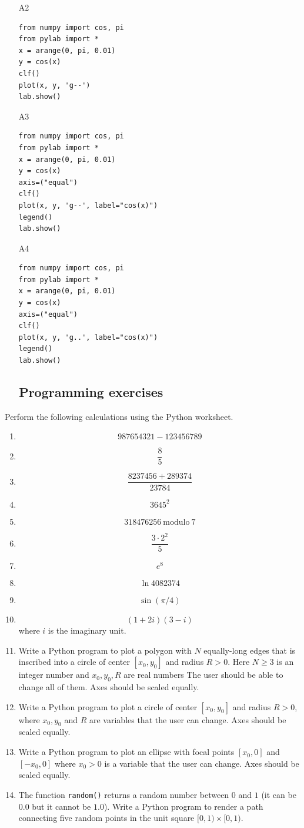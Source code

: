\begin{enumerate}
\begin{enumerate}
\item[A2] 
\begin{verbatim}
from numpy import cos, pi
from pylab import *
x = arange(0, pi, 0.01)
y = cos(x)
clf()
plot(x, y, 'g--')
lab.show()
\end{verbatim}
\item[A3] 
\begin{verbatim}
from numpy import cos, pi
from pylab import *
x = arange(0, pi, 0.01)
y = cos(x)
axis=("equal")
clf()
plot(x, y, 'g--', label="cos(x)")
legend()
lab.show()
\end{verbatim}
\item[A4] 
\begin{verbatim}
from numpy import cos, pi
from pylab import *
x = arange(0, pi, 0.01)
y = cos(x)
axis=("equal")
clf()
plot(x, y, 'g..', label="cos(x)")
legend()
lab.show()
\end{verbatim}
\end{enumerate}
\end{enumerate}

\subsection{\ \ Programming exercises}
Perform the following calculations using the Python worksheet.
\begin{enumerate}
\item 
$$
  987654321 - 123456789
$$
\item 
$$
\frac{8}{5}
$$
\item 
$$
  \frac{8237456 + 289374}{23784}
$$ 
\item 
$$
  3645^2
$$
\item 
$$
  318476256 \ \mbox{modulo} \ 7
$$
\item 
$$
  \frac{3\cdot 2^2}{5} 
$$
\item 
$$
  e^8
$$
\item 
$$
  \ln 4082374
$$
\item 
$$
  \sin(\pi / 4)
$$
\item 
$$
  (1 + 2i)(3 - i)
$$
where $i$ is the imaginary unit.
\item Write a Python program to plot a polygon with $N$ equally-long edges that is inscribed into a circle of 
center $[x_0, y_0]$ and radius $R > 0$. Here $N \ge 3$ is an integer number and $x_0, y_0, R$ are real numbers
The user should be able to change all of them. Axes should be scaled equally.
\item Write a Python program to plot a circle of center $[x_0, y_0]$ and radius $R > 0$, where 
$x_0, y_0$ and $R$ are variables that the user can change. Axes should be scaled equally.
\item Write a Python program to plot an ellipse with focal points $[x_0, 0]$ and $[-x_0, 0]$ where 
$x_0 > 0$ is a variable that the user can change. Axes should be scaled equally.
\item The function {\tt random()} returns a random number between $0$ and $1$ (it can be $0.0$ but it cannot be $1.0$).
Write a Python program to render a path connecting five random points in the unit square $[0, 1) \times [0, 1)$. 
\end{enumerate}

